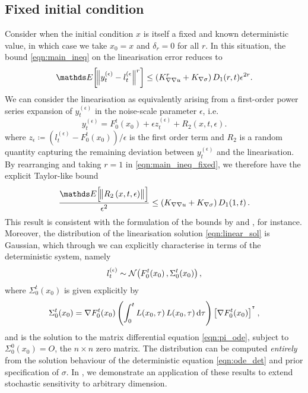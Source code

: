 \subsection{Fixed initial condition}\label{sec:theory_fixed}
Consider when the initial condition \(x\) is itself a fixed and known deterministic value, in which case we take \(x_0 = x\) and \(\delta_r = 0\) for all \(r\).
In this situation, the bound \eqref{eqn:main_ineq} on the linearisation error reduces to
\begin{equation}
	\avg{\norm{y_t^{(\epsilon)} - l_t^{(\epsilon}}^r} \leq \left(K_{\nabla\nabla u}^r + K_{\nabla\sigma}\right)D_1(r,t)\epsilon^{2r}.
	\label{eqn:main_ineq_fixed}
\end{equation}
We can consider the linearisation as equivalently arising from a first-order power series expansion of \(y_t^{(\epsilon)}\) in the noise-scale parameter \(\epsilon\), i.e.
\[
	y_t^{(\epsilon)} = F_0^t\!\left(x_0\right) + \epsilon z_t^{(\epsilon)} + R_2\left(x,t,\epsilon\right).
\]
where \(z_\epsilon \coloneqq \left(l_{t}^{(\epsilon)} - F_0^t\!\left(x_0\right)\right) / \epsilon\) is the first order term and \(R_2\) is a random quantity capturing the remaining deviation between \(y_t^{(\epsilon)}\) and the linearisation.
By rearranging and taking \(r = 1\) in \eqref{eqn:main_ineq_fixed}, we therefore have the explicit Taylor-like bound
\[
	\frac{\avg{\norm{R_2\left(x,t,\epsilon\right)}}}{\epsilon^2} \leq \left(K_{\nabla \nabla u} + K_{\nabla\sigma}\right)D_1\!\left(1, t\right).
\]
This result is consistent with the formulation of the bounds by \citet{Blagoveshchenskii_1962_DiffusionProcessesDepending} and \citet{FreidlinWentzell_1998_RandomPerturbationsDynamical}, for instance.
Moreover, the distribution of the linearisation solution \eqref{eqn:linear_sol} is Gaussian, which through  we can explicitly characterise in terms of the deterministic system, namely
\begin{equation}
	l_t^{(\epsilon)} \sim\mathcal{N}\!\left(F_0^t\!\left(x_0\right), \Sigma_0^t\!\left(x_0\right)\right),
	\label{eqn:linear_gauss_sol}
\end{equation}
where \(\Sigma_0^t\!\left(x_0\right)\) is given explicitly by
\begin{equation}\label{eqn:sigma_def}
	\Sigma_0^t\!\left(x_0\right) = \nabla F_0^t\!\left(x_0\right)\left(\int_0^t{L\!\left(x_0, \tau\right)L\!\left(x_0, \tau\right)\dif\tau}\right)\left[\nabla F_0^t\!\left(x_0\right)\right]^{\T},
\end{equation}
and is the solution to the matrix differential equation \eqref{eqn:pi_ode}, subject to \(\Sigma_0^0\!\left(x_0\right) = O\), the \(n \times n\) zero matrix.
The distribution can be computed \emph{entirely} from the solution behaviour of the deterministic equation \eqref{eqn:ode_det} and prior specification of \(\sigma\).
In , we demonstrate an application of these results to extend stochastic sensitivity \cite{Balasuriya_2020_StochasticSensitivityComputable} to arbitrary dimension.

